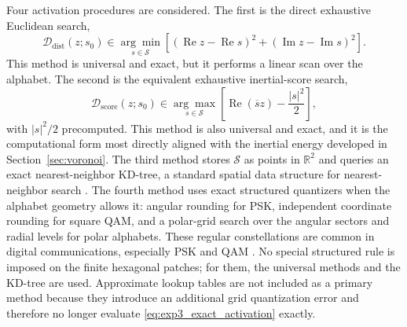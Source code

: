 \documentclass[10pt,journal,letterpaper]{IEEEtran}
\begin{document}
Four activation procedures are considered. The first is the direct exhaustive
Euclidean search,
\begin{equation}
    \mathcal{D}_{\mathrm{dist}}(z;s_0)
    \in
    \underset{s\in\mathcal{S}}{\arg\min}
    \left[
    (\operatorname{Re}z-\operatorname{Re}s)^2
    +
    (\operatorname{Im}z-\operatorname{Im}s)^2
    \right].
\end{equation}
This method is universal and exact, but it performs a linear scan over the
alphabet. The second is the equivalent exhaustive inertial-score search,
\begin{equation}
    \mathcal{D}_{\mathrm{score}}(z;s_0)
    \in
    \underset{s\in\mathcal{S}}{\arg\max}
    \left[
    \operatorname{Re}(\overline{s}z)-\frac{|s|^2}{2}
    \right],
\label{eq:exp3_inertial_score}
\end{equation}
with $|s|^2/2$ precomputed. This method is also universal and exact, and it is
the computational form most directly aligned with the inertial energy
developed in Section~\ref{sec:voronoi}. The third method stores
$\mathcal{S}$ as points in $\mathbb{R}^2$ and queries an exact nearest-neighbor
KD-tree, a standard spatial data structure for nearest-neighbor search
\cite{bentley1975,friedman1977}. The fourth method uses exact structured
quantizers when the alphabet geometry allows it: angular rounding for PSK,
independent coordinate rounding for square QAM, and a polar-grid search over
the angular sectors and radial levels for polar alphabets. These regular
constellations are common in digital communications, especially PSK and QAM
\cite{proakis2008}. No special structured rule is imposed on the finite
hexagonal patches; for them, the universal methods and the KD-tree are used.
Approximate lookup tables are not included as a primary method because they
introduce an additional grid quantization error and therefore no longer
evaluate \eqref{eq:exp3_exact_activation} exactly.
\end{document}
